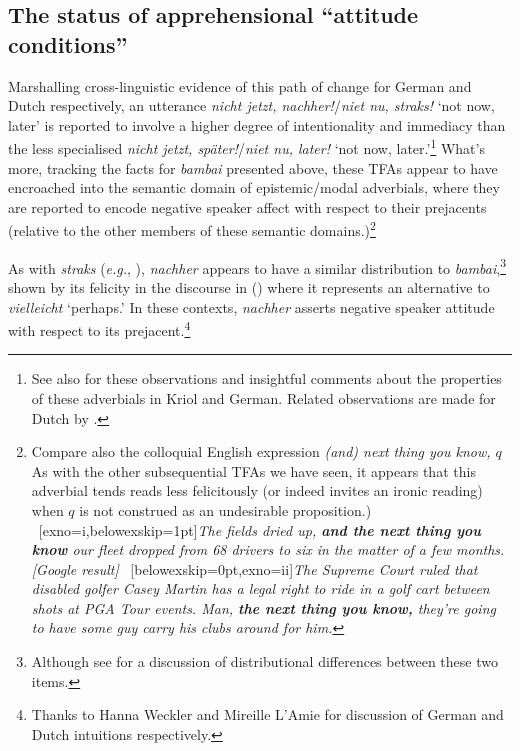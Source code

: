 \subsection{The status of apprehensional ``attitude conditions''}
Marshalling cross-linguistic evidence of this path of change for German and Dutch respectively, an utterance \textit{nicht jetzt, nachher!}/\textit{niet nu, straks!} `not now, later' is reported to involve a higher degree of intentionality and immediacy than the less specialised \textit{nicht jetzt, später!}/\textit{niet nu, later!} `not now, later.'\footnote{See also \citealt{Angelo2018} for these observations and insightful comments about the properties of these adverbials in Kriol and German. Related observations are made for Dutch by \citet{Boogaart2020}.} What's more, tracking the facts for \textit{bambai} presented above, these TFAs appear to have encroached into the semantic domain of epistemic/modal adverbials, where they are reported to encode negative speaker affect with respect to their prejacents (relative to the other members of these semantic domains.)\footnote{Compare also the colloquial English expression \textit{(and) next thing you know, $q$} As with the other subsequential TFAs we have seen, it appears that this adverbial tends reads less felicitously (or indeed invites an ironic reading) when $q$ is not construed as an undesirable proposition.)%
	\ex~[exno=i,belowexskip=1pt]\label{field}\textit{The fields dried up, \textbf{and the next thing you know} our fleet dropped from 68 drivers to six in the matter of a few months.\hfill[Google result]}\xe
	\ex~[belowexskip=0pt,exno=ii]\label{stew}\textit{The Supreme Court ruled that disabled golfer Casey Martin has a legal right to ride in a golf cart between shots at PGA Tour events. Man, \textbf{the next thing you know,} they're going to have some guy carry his clubs around for him.}\xe}

As with \textit{straks} (\textit{e.g.}, ), \textit{nachher} appears to have a similar distribution to \textit{bambai},\footnote{Although see \citet[30]{Angelo2018} for a discussion of distributional differences between these two items.} shown by its felicity in the discourse in () where it represents an alternative to \textit{vielleicht} `perhaps.'
 In these contexts, \textit{nachher} asserts negative speaker attitude with respect to its prejacent.\footnote{Thanks to Hanna Weckler and Mireille L'Amie for discussion of German and Dutch intuitions respectively.}

